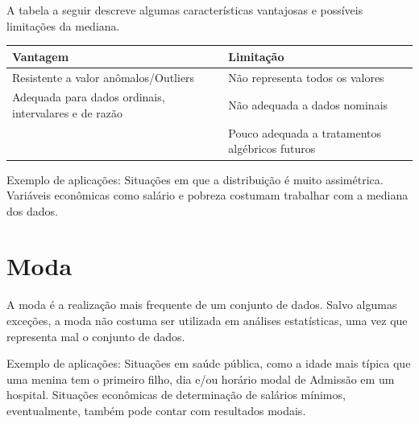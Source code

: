 \documentclass[
]{book}
\begin{document}
A tabela a seguir descreve algumas características vantajosas e
possíveis limitações da mediana.

\begin{longtable}[]{@{}ll@{}}
\toprule
\begin{minipage}[b]{0.47\columnwidth}\raggedright
Vantagem\strut
\end{minipage} & \begin{minipage}[b]{0.47\columnwidth}\raggedright
Limitação\strut
\end{minipage}\tabularnewline
\midrule
\endhead
\begin{minipage}[t]{0.47\columnwidth}\raggedright
Resistente a valor anômalos/Outliers\strut
\end{minipage} & \begin{minipage}[t]{0.47\columnwidth}\raggedright
Não representa todos os valores\strut
\end{minipage}\tabularnewline
\begin{minipage}[t]{0.47\columnwidth}\raggedright
Adequada para dados ordinais, intervalares e de razão\strut
\end{minipage} & \begin{minipage}[t]{0.47\columnwidth}\raggedright
Não adequada a dados nominais\strut
\end{minipage}\tabularnewline
\begin{minipage}[t]{0.47\columnwidth}\raggedright
\strut
\end{minipage} & \begin{minipage}[t]{0.47\columnwidth}\raggedright
Pouco adequada a tratamentos algébricos futuros\strut
\end{minipage}\tabularnewline
\bottomrule
\end{longtable}

Exemplo de aplicações: Situações em que a distribuição é muito
assimétrica. Variáveis econômicas como salário e pobreza costumam
trabalhar com a mediana dos dados.

\hypertarget{moda}{%
\section{Moda}\label{moda}}

A moda é a realização mais frequente de um conjunto de dados. Salvo
algumas exceções, a moda não costuma ser utilizada em análises
estatísticas, uma vez que representa mal o conjunto de dados.

Exemplo de aplicações: Situações em saúde pública, como a idade mais
típica que uma menina tem o primeiro filho, dia e/ou horário modal de
Admissão em um hospital. Situações econômicas de determinação de
salários mínimos, eventualmente, também pode contar com resultados
modais.
\end{document}
